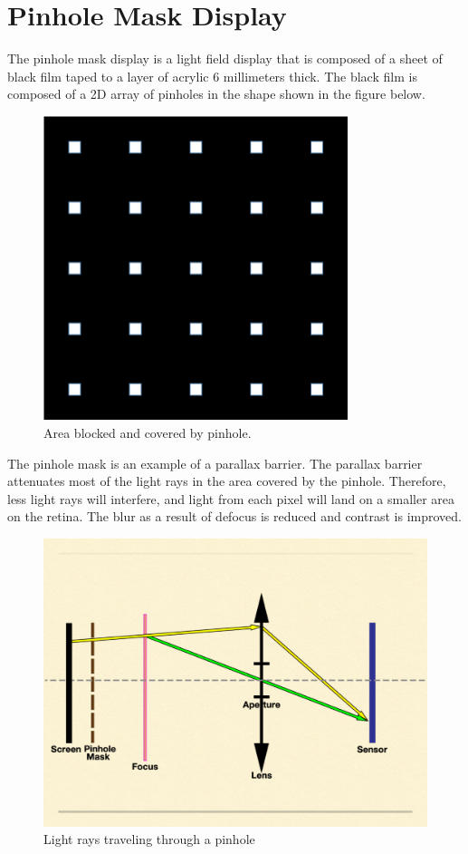 \section{Pinhole Mask Display}

The pinhole mask display is a light field display that is composed of a sheet of black film taped to a layer of acrylic 6 millimeters thick. The black film is composed of a 2D array of pinholes in the shape shown in the figure below.

\begin{figure}[ht]
  \centering
  \includegraphics[width=3.5in]{chapters/chapter3/images/pmask.png}
  \caption{Area blocked and covered by pinhole.}
  \label{fig:pinhole}
\end{figure}

The pinhole mask is an example of a parallax barrier. The parallax barrier attenuates most of the light rays in the area covered by the pinhole. Therefore, less light rays will interfere, and light from each pixel will land on a smaller area on the retina. The blur as a result of defocus is reduced and contrast is improved. 

\begin{figure}[ht]
  \centering
  \includegraphics[width=5.0in]{chapters/chapter3/images/pinhole_rays.png}
  \caption{Light rays traveling through a pinhole \cite{Wu:EECS-2016-67}}
  \label{fig:pinhole_light}
\end{figure}

